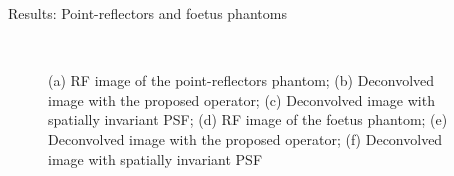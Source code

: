{\begin{block}{Results: Point-reflectors and foetus phantoms}
\begin{figure}
		~
		\caption{(a) RF image of the point-reflectors phantom; (b) Deconvolved image with the proposed operator; (c) Deconvolved image with spatially invariant PSF; (d) RF image of the foetus phantom; (e) Deconvolved image with the proposed operator; (f) Deconvolved image with spatially invariant PSF}
	\end{figure}


\end{block}}
